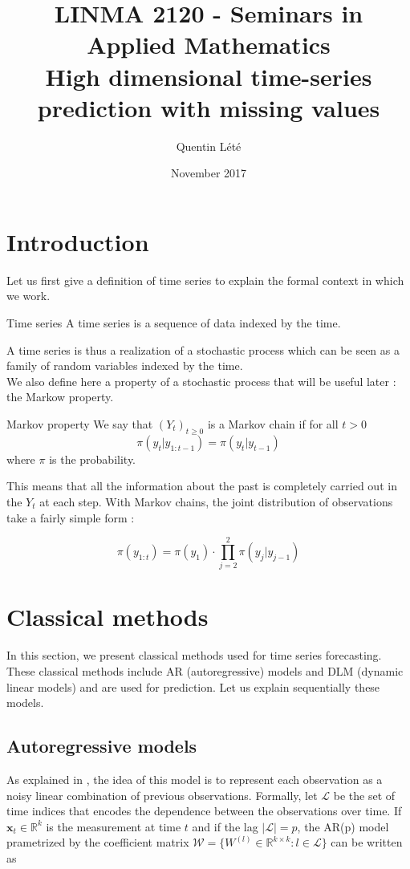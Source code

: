 \documentclass{article}
\title{LINMA 2120 - Seminars in Applied Mathematics \\
        High dimensional time-series prediction with missing values}
\author{Quentin Lété}
\date{November 2017}
\begin{document}
\maketitle

\section{Introduction}

Let us first give a definition of time series to explain the formal context in which we work. \\

\theoremstyle{definition}
\begin{definition}{Time series}
A time series is a sequence of data indexed by the time.
\end{definition}

A time series is thus a realization of a stochastic process which can be seen as a family of random variables indexed by the time. \\

We also define here a property of a stochastic process that will be useful later : the Markow property. \\

\theoremstyle{definition}
\begin{definition}{Markov property}
We say that $(Y_t)_{t \ge 0}$ is a Markov chain if for all $t > 0$
$$\pi(y_t|y_{1:t-1}) = \pi(y_t|y_{t-1})$$
where $\pi$ is the probability.
\end{definition}

This means that all the information about the past is completely carried out in the $Y_t$ at each step. With Markov chains, the joint distribution of observations take a fairly simple form :

$$\pi(y_{1:t}) = \pi(y_1) \cdot \prod_{j=2}^2 \pi(y_j|y_{j-1})$$

\section{Classical methods}
In this section, we present classical methods used for time series forecasting.
These classical methods include AR (autoregressive) models and DLM (dynamic linear models) and are used for prediction.
Let us explain sequentially these models.

\subsection*{Autoregressive models}
As explained in \cite{pmlr-v37-anava15}, the idea of this model is to represent each observation as a noisy linear combination of previous observations.
Formally, let $\mathcal{L}$ be the set of time indices that encodes the dependence between the observations over time. If $\mathbf{x}_t \in \mathbb{R}^k$ is the measurement at time $t$ and if the lag $|\mathcal{L}| = p$, the AR(p) model prametrized by the coefficient matrix $\mathcal{W} = \{W^{(l)} \in \mathbb{R}^{k \times k} : l \in \mathcal{L} \}$ can be written as
\end{document}
